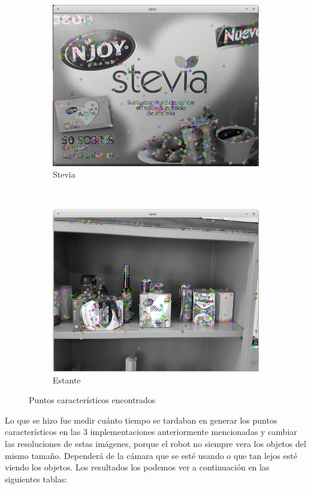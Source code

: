 \begin{figure}[H]
    \begin{subfigure}[b]{0.35\textwidth}
        \includegraphics[width=\textwidth]{img/stevia.png}
        \caption{Stevia}
    \end{subfigure}
    ~ %
      \begin{subfigure}[b]{0.35\textwidth}
        \includegraphics[width=\textwidth]{img/estante.png}
        \caption{Estante}
    \end{subfigure}
    \caption{Puntos característicos encontrados }
\end{figure}
Lo que se hizo fue medir cuánto tiempo se tardaban en generar los puntos característicos en las 3 implementaciones anteriormente mencionadas y cambiar las resoluciones de estas imágenes, porque el robot no siempre vera los objetos del mismo tamaño. Dependerá de la cámara que se esté usando o que tan lejos esté viendo los objetos. Los resultados los podemos ver a continuación en las siguientes tablas:
